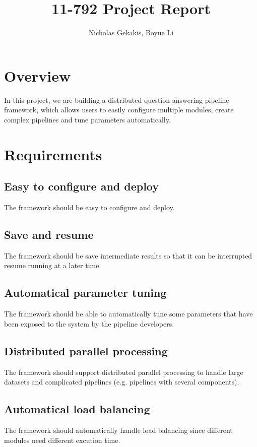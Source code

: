 \documentclass{article}
\begin{document}
\title{11-792 Project Report}
 
\author{Nicholas Gekakis, Boyue Li}
 
\maketitle
 
\section{Overview}

In this project, we are building a distributed question answering pipeline framework,
which allows users to easily configure multiple modules,
create complex pipelines and tune parameters automatically.

\section{Requirements}

    \subsection{Easy to configure and deploy}
    The framework should be easy to configure and deploy.

    \subsection{Save and resume}
    The framework should be save intermediate results so that it can be interrupted resume running at a later time.

    \subsection{Automatical parameter tuning}
    The framework should be able to automatically tune some parameters that have been exposed to the system by the pipeline developers.

    \subsection{Distributed parallel processing}
    The framework should support distributed parallel processing to handle large datasets and complicated pipelines (e.g. pipelines with several components).

    \subsection{Automatical load balancing}
    The framework should automatically handle load balancing since different modules need different excution time.
\end{document}
